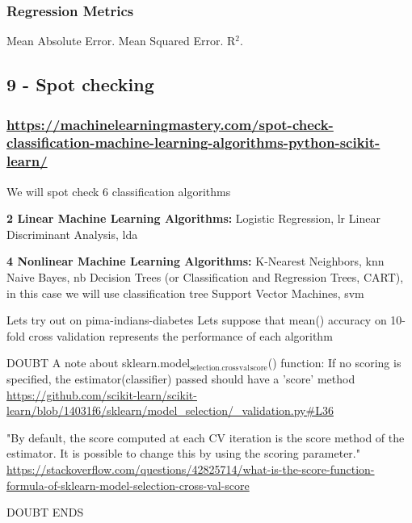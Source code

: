 \documentclass[11pt]{article}
\begin{document}
\subsubsection{Regression Metrics}
\label{sec:orgd478be4}
Mean Absolute Error.
Mean Squared Error.
R\(^{\text{2}}\).

\subsection{9 - Spot checking}
\label{sec:org85ed88c}
\subsubsection{\url{https://machinelearningmastery.com/spot-check-classification-machine-learning-algorithms-python-scikit-learn/}}
\label{sec:orga09331e}

We will spot check 6 classification algorithms

\textbf{2 Linear Machine Learning Algorithms:}
Logistic Regression, lr
Linear Discriminant Analysis, lda

\textbf{4 Nonlinear Machine Learning Algorithms:}
K-Nearest Neighbors, knn
Naive Bayes, nb
Decision Trees (or Classification and Regression Trees, CART), in this case we will use classification tree
Support Vector Machines, svm

Lets try out on pima-indians-diabetes
Lets suppose that mean() accuracy on 10-fold cross validation represents the performance of each algorithm

DOUBT
A note about sklearn.model\(_{\text{selection.cross}}\)\(_{\text{val}}\)\(_{\text{score}}\)() function:
If no scoring is specified, the estimator(classifier) passed should have a 'score' method
\url{https://github.com/scikit-learn/scikit-learn/blob/14031f6/sklearn/model\_selection/\_validation.py\#L36}

"By default, the score computed at each CV iteration is the score
method of the estimator. It is possible to change this by using the
scoring parameter." 
\url{https://stackoverflow.com/questions/42825714/what-is-the-score-function-formula-of-sklearn-model-selection-cross-val-score}

DOUBT ENDS
\end{document}
